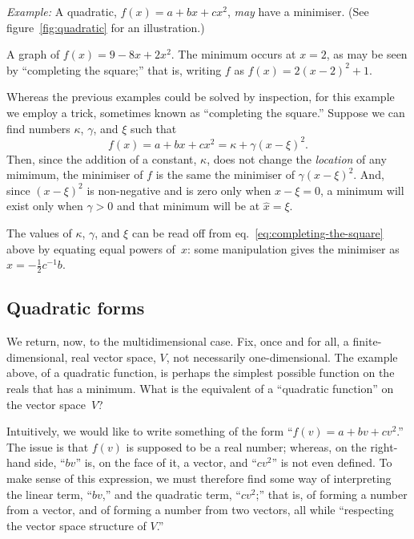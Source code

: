 \documentclass[10pt, a4paper]{article}
\newcommand{\eg}{\emph{Example:}}
\begin{document}
\eg{} A quadratic, $f(x) = a + bx + cx^2$, \emph{may} have a
minimiser. (See figure~\ref{fig:quadratic} for an illustration.)
\begin{marginfigure}
  \begin{center}
  \end{center}
  \caption{A graph of $f(x) = 9 - 8x + 2x^2$. The minimum occurs at
    $x=2$, as may be seen by “completing the square;” that is, writing
    $f$ as $f(x) = 2{(x-2)}^2+1$.\label{fig:quadratic}}
\end{marginfigure}
Whereas the previous examples could be solved by inspection, for this
example we employ a trick, sometimes known as “completing the square.”
Suppose we can find numbers $\kappa$, $\gamma$, and $\xi$ such that
\begin{equation}
  f(x) = a + bx + cx^2 = \kappa + \gamma{(x - \xi)}^2.
\label{eq:completing-the-square}
\end{equation}
Then, since the addition of a constant, $\kappa$, does not change the
\emph{location} of any mimimum, the minimiser of $f$ is the same the
minimiser of $\gamma{(x-\xi)}^2$. And, since ${(x-\xi)}^2$ is non-negative and
is zero only when $x-\xi=0$, a minimum will exist only when $\gamma >0$ and
that minimum will be at $\hat{x}=\xi$.

The values of $\kappa$, $\gamma$, and $\xi$ can be read off from
eq.~\eqref{eq:completing-the-square} above by equating equal powers
of~$x$: some manipulation gives the minimiser as
$\hat{x}=-\frac{1}{2}c^{-1}b$.

\subsection*{Quadratic forms}
We return, now, to the multidimensional case. Fix, once and for all, a
finite-dimensional, real vector space, $V$, not necessarily
one-dimensional. The example above, of a quadratic function, is
perhaps the simplest possible function on the reals that has a
minimum. What is the equivalent of a ``quadratic function'' on the
vector space~$V$?

Intuitively, we would like to write something of the form
``$f(v) = a+bv+cv^2$.'' The issue is that $f(v)$ is supposed to be a
real number; whereas, on the right-hand side, ``$bv$'' is, on the face
of it, a vector, and ``$cv^2$'' is not even defined. To make sense of
this expression, we must therefore find some way of interpreting the
linear term, ``$bv$,'' and the quadratic term, ``$cv^2$;'' that is, of
forming a number from a vector, and of forming a number from two
vectors, all while “respecting the vector space structure of $V$.”
\end{document}
